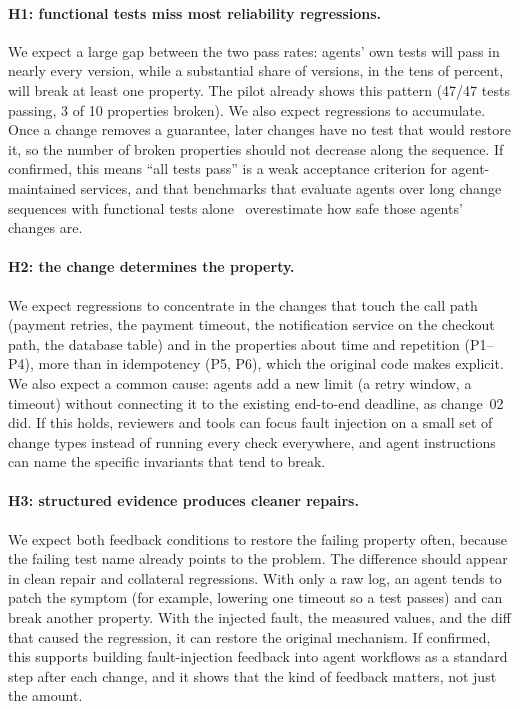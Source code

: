 \paragraph{H1: functional tests miss most reliability regressions.}
We expect a large gap between the two pass rates: agents' own tests will pass in nearly every
version, while a substantial share of versions, in the tens of percent, will break at least one
property. The pilot already shows this pattern (47/47 tests passing, 3 of 10 properties broken).
We also expect regressions to accumulate. Once a change removes a guarantee, later changes have
no test that would restore it, so the number of broken properties should not decrease along the
sequence. If confirmed, this means ``all tests pass'' is a weak acceptance criterion for
agent-maintained services, and that benchmarks that evaluate agents over long change sequences
with functional tests alone~\cite{deng2026evoclaw,le2025sweevo} overestimate how safe those
agents' changes are.

\paragraph{H2: the change determines the property.}
We expect regressions to concentrate in the changes that touch the call path (payment retries, the
payment timeout, the notification service on the checkout path, the database table) and in the
properties about time and repetition (P1--P4), more than in idempotency (P5, P6), which the
original code makes explicit. We also expect a common cause: agents add a new limit (a retry window,
a timeout) without connecting it to the existing end-to-end deadline, as change~02 did. If this
holds, reviewers and tools can focus fault injection on a small set of change types instead of
running every check everywhere, and agent instructions can name the specific invariants that
tend to break.

\paragraph{H3: structured evidence produces cleaner repairs.}
We expect both feedback conditions to restore the failing property often, because the failing test
name already points to the problem. The difference should appear in clean repair and collateral
regressions. With only a raw log, an agent tends to patch the symptom (for example, lowering one
timeout so a test passes) and can break another property. With the injected fault, the measured
values, and the diff that caused the regression, it can restore the original mechanism. If
confirmed, this supports building fault-injection feedback into agent workflows as a standard step
after each change, and it shows that the kind of feedback matters, not just the amount.


